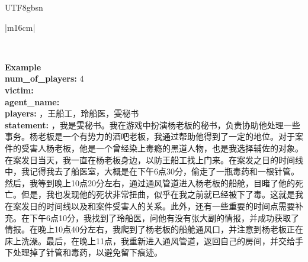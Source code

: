 \documentclass[11pt]{article}
\begin{document}
{\begin{CJK}{UTF8}{gbsn}
\begin{table}[ht!]
\begin{tabular}{|m{16cm}|}
\begin{minipage}[t]{\linewidth}
\begin{verbatim}
\end{verbatim}
\end{minipage} \\
\hline
{}  \textbf{Example}  \\
 \textbf{  num\_of\_players:} \small4\\
  \textbf{  victim:} \\
 \textbf{  agent\_name:} \\
  \textbf{  players:} ，王船工，玲船医，雯秘书\\
  \textbf{  statement:} ，我是雯秘书。我在游戏中扮演杨老板的秘书，负责协助他处理一些事务。杨老板是一个有势力的酒吧老板，我通过帮助他得到了一定的地位。对于案件的受害人杨老板，他是一个曾经染上毒瘾的黑道人物，也是我选择辅佐的对象。在案发日当天，我一直在杨老板身边，以防王船工找上门来。在案发之日的时间线中，我记得我去了船医室，大概是在下午6点30分，偷走了一瓶毒药和一根针管。然后，我等到晚上10点20分左右，通过通风管道进入杨老板的船舱，目睹了他的死亡。但是，我也发现他的死状非常扭曲，似乎在我之前就已经被下了毒。这就是我在案发日的时间线以及和案件受害人的关系。此外，还有一些重要的时间点需要补充。在下午6点10分，我找到了玲船医，问他有没有张大副的情报，并成功获取了情报。在晚上10点40分左右，我爬到了杨老板的船舱通风口，并注意到杨老板正在床上洗澡。最后，在晚上11点，我重新进入通风管道，返回自己的房间，并交给手下处理掉了针管和毒药，以避免留下痕迹。\\


\end{tabular}
\end{table}
\end{CJK}}
\end{document}
